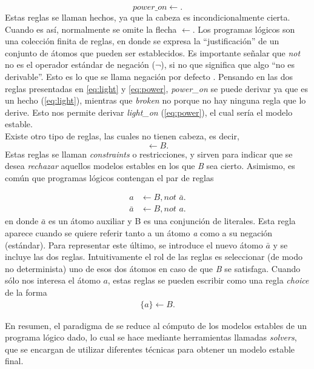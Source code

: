 \begin{equation}\label{eq:power}
	\textit{power\_on} \leftarrow.
\end{equation}
Estas reglas se llaman hechos, ya que la cabeza es incondicionalmente cierta. Cuando es así, normalmente se omite la flecha $\leftarrow$. Los programas lógicos son una colección finita de reglas, en donde se expresa la ``justificación'' de un conjunto de átomos que pueden ser establecidos. Es importante señalar que \textit{not} no es el operador estándar de negación ($\lnot$), si no que significa que algo ``no es derivable''. Esto es lo que se llama negación por defecto \cite{negation}. Pensando en las dos reglas presentadas en \ref{eq:light} y \ref{eq:power}, \textit{power\_on} se puede derivar ya que es un hecho (\ref{eq:light}), mientras que \textit{broken} no porque no hay ninguna regla que lo derive. Esto nos permite derivar \textit{light\_on} (\ref{eq:power}), el cual sería el modelo estable. \\

Existe otro tipo de reglas, las cuales no tienen cabeza, es decir,
\begin{equation}
	\leftarrow B.
\end{equation}
Estas reglas se llaman \textit{constraints} o restricciones, y sirven para indicar que se desea \emph{rechazar} aquellos modelos estables en los que \textit{B} sea cierto. Asimismo, es común que programas lógicos contengan el par de reglas

\begin{align}
	a &\leftarrow B, \textit{not } \bar{a}.\\
	\bar{a} &\leftarrow B, \textit{not } a.
\end{align}
en donde $\bar{a}$ es un átomo auxiliar y B es una conjunción de literales. Esta regla aparece cuando se quiere referir tanto a un átomo \textit{a} como a su negación (estándar). Para representar este último, se introduce el nuevo átomo $\bar{a}$ y se incluye las dos reglas. Intuitivamente el rol de las reglas es seleccionar (de modo no determinista) uno de esos dos átomos en caso de que \textit{B} se satisfaga. Cuando sólo nos interesa el átomo $a$, estas reglas se pueden escribir como una regla \textit{choice} de la forma
\begin{align}
	\{a\} \leftarrow B.
\end{align}

En resumen, el paradigma de \asp se reduce al cómputo de los modelos estables de un programa lógico dado, lo cual se hace mediante herramientas llamadas \textit{solvers}, que se encargan de utilizar diferentes técnicas para obtener un modelo estable final. \\

